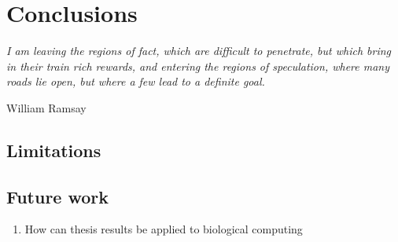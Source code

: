 \chapter{Conclusions}
\label{chapter:conclusions}

\epigraph{\textit{I am leaving the regions of fact, which are difficult to penetrate, but which bring in their train rich rewards, and entering the regions of speculation, where many roads lie open, but where a few lead to a definite goal.}}{William Ramsay}
\section{Limitations}

\section{Future work}
\begin{enumerate}
    \item How can thesis results be applied to biological computing \cite{Dalchau2018}
\end{enumerate}